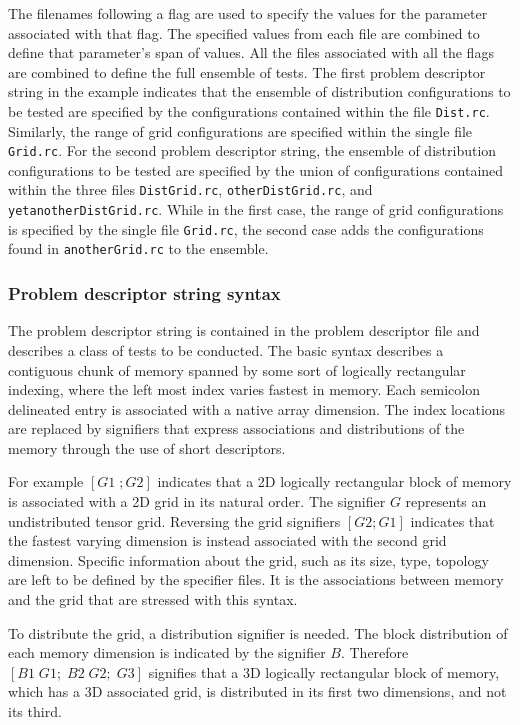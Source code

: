 The filenames following a flag are used to specify the values for the parameter associated with that flag. 
The specified values from each file are combined to define that parameter's span of values.  
All the files associated with all the flags are combined to define the full ensemble of tests. 
The first problem descriptor string in the example indicates that the ensemble of distribution 
configurations to be tested are specified by the configurations contained within the file \texttt{Dist.rc}. 
Similarly, the range of grid configurations are specified within the single file \texttt{Grid.rc}. 
For the second problem descriptor string, the ensemble of distribution configurations 
to be tested are specified by the union of configurations contained within the 
three files \texttt{DistGrid.rc}, \texttt{otherDistGrid.rc}, and \texttt{yetanotherDistGrid.rc}. 
While in the first case, the range of grid configurations is specified by the single 
file \texttt{Grid.rc}, the second case adds the configurations found in \texttt{anotherGrid.rc} to the ensemble.


\subsubsection{Problem descriptor string syntax}
The problem descriptor string is contained in the problem descriptor file and describes a 
class of tests to be conducted. 
The basic syntax describes a contiguous chunk of memory spanned by some sort of logically 
rectangular indexing, where the left most index varies fastest in memory. 
Each semicolon delineated entry is associated with a native array dimension. 
The index locations are replaced by signifiers that express associations and distributions 
of the memory through the use of short descriptors. 

For example $[ G1 \; ; G2 ]$ indicates that a 2D logically rectangular block of memory 
is associated with a 2D grid in its natural order. 
The signifier $G$ represents an undistributed tensor grid. 
Reversing the grid signifiers $[ G2; G1 ]$ indicates that the fastest varying dimension 
is instead associated with the second grid dimension. 
Specific information about the grid, such as its size, type, topology are left to be defined 
by the specifier files. It is the associations between memory and the grid that are stressed with this syntax.

To distribute the grid, a distribution signifier is needed. 
The block distribution of each memory dimension is indicated by the signifier $B$. 
Therefore $[B1 \; G1; \; B2 \; G2; \; G3]$ signifies that a 3D logically rectangular block of memory, 
which has a 3D associated grid, is distributed in its first two dimensions, and not its third.

